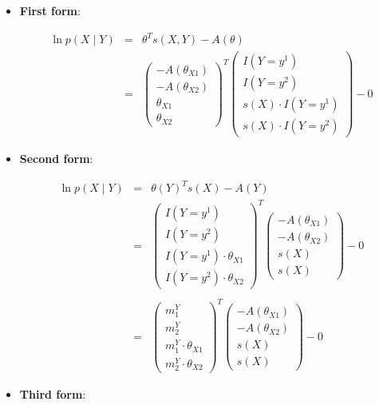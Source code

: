 \documentclass[11pt, oneside]{article}   	%
\numberwithin{figure}{section}
\numberwithin{equation}{section}
\numberwithin{table}{section}
\theoremstyle{definition}
\begin{document}
\begin{appendices}
\begin{itemize}
\item \textbf{First form}:

\begin{eqnarray*}
\ln p(X \mid Y) &=& \theta^T s(X,Y) - A(\theta) \\
&=&
\begin{pmatrix}
- A(\theta_{X1}) \\
- A(\theta_{X2}) \\
\theta_{X1} \\
\theta_{X2}
\end{pmatrix}^T
\begin{pmatrix}
I(Y=y^1) \\
I(Y=y^2) \\
s(X) \cdot I(Y=y^1) \\
s(X) \cdot I(Y=y^2)
\end{pmatrix}
- 0 
\end{eqnarray*}

\item \textbf{Second form}:

\begin{eqnarray*}
\ln p(X \mid Y) &=& \theta(Y)^Ts(X) - A(Y) \\
&=&
\begin{pmatrix}
I(Y=y^1)\\
I(Y=y^2)\\
I(Y=y^1) \cdot \theta_{X1}\\
I(Y=y^2) \cdot \theta_{X2}
\end{pmatrix}^T
\begin{pmatrix}
- A(\theta_{X1}) \\
- A(\theta_{X2}) \\
s(X) \\
s(X) 
\end{pmatrix}
- 0 \\\\
&=&
\begin{pmatrix}
m^Y_1\\
m^Y_2 \\
m^Y_1 \cdot \theta_{X1}\\
m^Y_2 \cdot \theta_{X2}
\end{pmatrix}^T
\begin{pmatrix}
- A(\theta_{X1}) \\
- A(\theta_{X2}) \\
s(X) \\
s(X) 
\end{pmatrix}
- 0 
\end{eqnarray*}

\item \textbf{Third form}:


\end{itemize}
\end{appendices}
\end{document}
